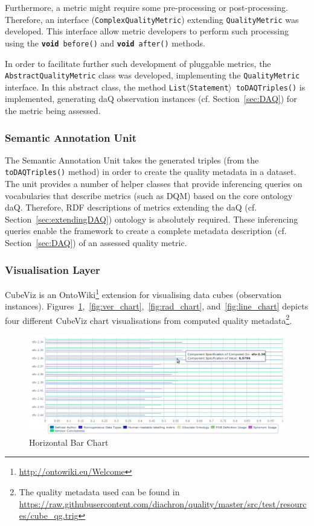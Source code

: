 Furthermore, a metric might require some pre-processing or post-processing.
Therefore, an interface (\texttt{ComplexQualityMetric}) extending \texttt{QualityMetric} was developed.
This interface allow metric developers to perform such processing using the \texttt{\textbf{void} before()} and \texttt{\textbf{void} after()} methods.

In order to facilitate further such development of pluggable metrics, the \texttt{AbstractQualityMetric} class was developed, implementing the \texttt{QualityMetric} interface.
In this abstract class, the method \texttt{List$\langle$Statement$\rangle$ toDAQTriples()} is implemented, generating daQ observation instances (cf. Section~\ref{sec:DAQ}) for the metric being assessed. 

\subsubsection{Semantic Annotation Unit}
The Semantic Annotation Unit takes the generated triples (from the \texttt{toDAQTriples()} method) in order to create the quality metadata in a dataset.
The unit provides a number of helper classes that provide inferencing queries on vocabularies that describe metrics (such as DQM) based on the core ontology daQ.
Therefore, RDF descriptions of metrics extending the daQ (cf. Section~\ref{sec:extendingDAQ}) ontology is absolutely required.
These inferencing queries enable the framework to create a complete metadata description (cf. Section~\ref{sec:DAQ}) of an assessed quality metric.

\subsubsection{Visualisation Layer}
\label{sec:vislayer_hla}
CubeViz is an OntoWiki\footnote{\url{http://ontowiki.eu/Welcome}} extension for visualising data cubes (observation instances).
Figures~\ref{fig:hor_chart},~\ref{fig:ver_chart},~\ref{fig:rad_chart}, and~\ref{fig:line_chart} depicts four different CubeViz chart visualisations from computed quality metadata\footnote{The quality metadata used can be found in \url{https://raw.githubusercontent.com/diachron/quality/master/src/test/resources/cube_qg.trig}}.

\begin{figure}[tbph]
\center
  \includegraphics[scale=0.3]{images/cube_1.png}
\caption{Horizontal Bar Chart} 
  \label{fig:hor_chart}
\end{figure}

